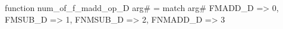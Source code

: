 function num_of_f_madd_op_D arg# = match arg# {
  FMADD_D => 0,
  FMSUB_D => 1,
  FNMSUB_D => 2,
  FNMADD_D => 3
}
